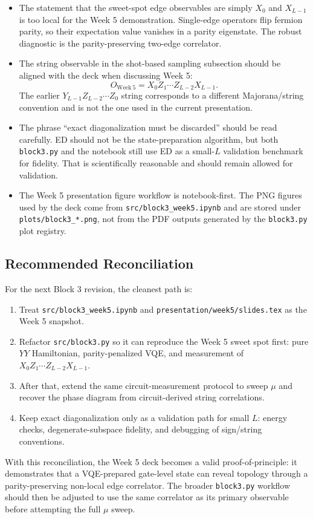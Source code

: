 \documentclass[11pt]{article}
\begin{document}
\begin{itemize}
  \item The statement that the sweet-spot edge observables are simply
  $X_0$ and $X_{L-1}$ is too local for the Week 5 demonstration. Single-edge
  operators flip fermion parity, so their expectation value vanishes in a
  parity eigenstate. The robust diagnostic is the parity-preserving two-edge
  correlator.

  \item The string observable in the shot-based sampling subsection should be
  aligned with the deck when discussing Week 5:
  \[
    O_{\mathrm{Week\ 5}}
    = X_0Z_1\cdots Z_{L-2}X_{L-1}.
  \]
  The earlier $Y_{L-1}Z_{L-2}\cdots Z_0$ string corresponds to a different
  Majorana/string convention and is not the one used in the current
  presentation.

  \item The phrase ``exact diagonalization must be discarded'' should be read
  carefully. ED should not be the state-preparation algorithm, but both
  \texttt{block3.py} and the notebook still use ED as a small-$L$ validation
  benchmark for fidelity. That is scientifically reasonable and should remain
  allowed for validation.

  \item The Week 5 presentation figure workflow is notebook-first. The PNG
  figures used by the deck come from \texttt{src/block3\_week5.ipynb} and are
  stored under \texttt{plots/block3\_*.png}, not from the PDF outputs generated
  by the \texttt{block3.py} plot registry.
\end{itemize}

\subsection{Recommended Reconciliation}

For the next Block 3 revision, the cleanest path is:
\begin{enumerate}
  \item Treat \texttt{src/block3\_week5.ipynb} and
  \texttt{presentation/week5/slides.tex} as the Week 5 snapshot.
  \item Refactor \texttt{src/block3.py} so it can reproduce the Week 5 sweet
  spot first: pure $YY$ Hamiltonian, parity-penalized VQE, and measurement of
  $X_0Z_1\cdots Z_{L-2}X_{L-1}$.
  \item After that, extend the same circuit-measurement protocol to sweep
  $\mu$ and recover the phase diagram from circuit-derived string correlations.
  \item Keep exact diagonalization only as a validation path for small $L$:
  energy checks, degenerate-subspace fidelity, and debugging of sign/string
  conventions.
\end{enumerate}

With this reconciliation, the Week 5 deck becomes a valid proof-of-principle:
it demonstrates that a VQE-prepared gate-level state can reveal topology through
a parity-preserving non-local edge correlator. The broader \texttt{block3.py}
workflow should then be adjusted to use the same correlator as its primary
observable before attempting the full $\mu$ sweep.
\end{document}
